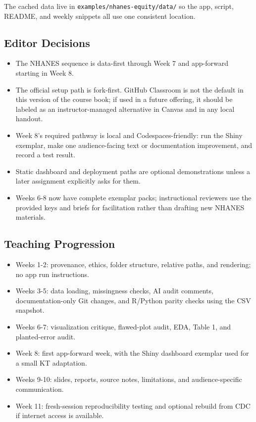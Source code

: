 \documentclass[
  letterpaper,
  DIV=11,
  numbers=noendperiod,
  oneside]{scrreprt}
\providecommand{\tightlist}{%
  \setlength{\itemsep}{0pt}\setlength{\parskip}{0pt}}
\begin{document}
The cached data live in \texttt{examples/nhanes-equity/data/} so the
app, script, README, and weekly snippets all use one consistent
location.

\subsection*{Editor Decisions}\label{editor-decisions}

\begin{itemize}
\tightlist
\item
  The NHANES sequence is data-first through Week 7 and app-forward
  starting in Week 8.
\item
  The official setup path is fork-first. GitHub Classroom is not the
  default in this version of the course book; if used in a future
  offering, it should be labeled as an instructor-managed alternative in
  Canvas and in any local handout.
\item
  Week 8's required pathway is local and Codespaces-friendly: run the
  Shiny exemplar, make one audience-facing text or documentation
  improvement, and record a test result.
\item
  Static dashboard and deployment paths are optional demonstrations
  unless a later assignment explicitly asks for them.
\item
  Weeks 6-8 now have complete exemplar packs; instructional reviewers
  use the provided keys and briefs for facilitation rather than drafting
  new NHANES materials.
\end{itemize}

\subsection*{Teaching Progression}\label{teaching-progression}

\begin{itemize}
\tightlist
\item
  Weeks 1-2: provenance, ethics, folder structure, relative paths, and
  rendering; no app run instructions.
\item
  Weeks 3-5: data loading, missingness checks, AI audit comments,
  documentation-only Git changes, and R/Python parity checks using the
  CSV snapshot.
\item
  Weeks 6-7: visualization critique, flawed-plot audit, EDA, Table 1,
  and planted-error audit.
\item
  Week 8: first app-forward week, with the Shiny dashboard exemplar used
  for a small KT adaptation.
\item
  Weeks 9-10: slides, reports, source notes, limitations, and
  audience-specific communication.
\item
  Week 11: fresh-session reproducibility testing and optional rebuild
  from CDC if internet access is available.
\end{itemize}
\end{document}
